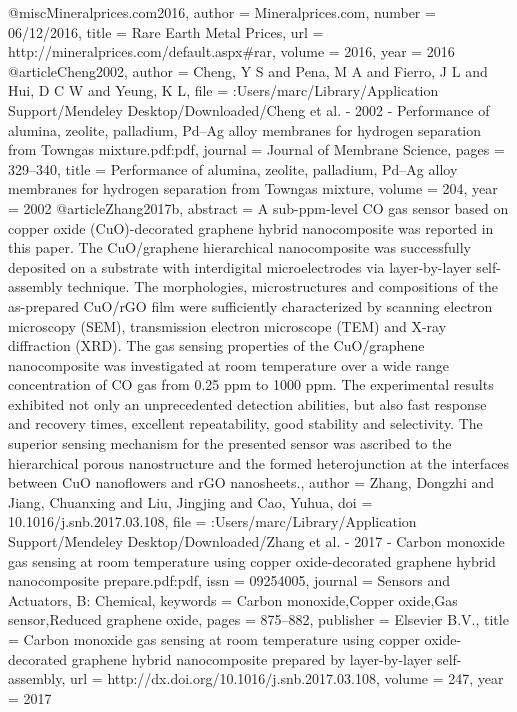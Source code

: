 @misc{Mineralprices.com2016,
author = {Mineralprices.com},
number = {06/12/2016},
title = {{Rare Earth Metal Prices}},
url = {http://mineralprices.com/default.aspx{\#}rar},
volume = {2016},
year = {2016}
}
@article{Cheng2002,
author = {Cheng, Y S and Pena, M A and Fierro, J L and Hui, D C W and Yeung, K L},
file = {:Users/marc/Library/Application Support/Mendeley Desktop/Downloaded/Cheng et al. - 2002 - Performance of alumina, zeolite, palladium, Pd–Ag alloy membranes for hydrogen separation from Towngas mixture.pdf:pdf},
journal = {Journal of Membrane Science},
pages = {329--340},
title = {{Performance of alumina, zeolite, palladium, Pd–Ag alloy membranes for hydrogen separation from Towngas mixture}},
volume = {204},
year = {2002}
}
@article{Zhang2017b,
abstract = {A sub-ppm-level CO gas sensor based on copper oxide (CuO)-decorated graphene hybrid nanocomposite was reported in this paper. The CuO/graphene hierarchical nanocomposite was successfully deposited on a substrate with interdigital microelectrodes via layer-by-layer self-assembly technique. The morphologies, microstructures and compositions of the as-prepared CuO/rGO film were sufficiently characterized by scanning electron microscopy (SEM), transmission electron microscope (TEM) and X-ray diffraction (XRD). The gas sensing properties of the CuO/graphene nanocomposite was investigated at room temperature over a wide range concentration of CO gas from 0.25 ppm to 1000 ppm. The experimental results exhibited not only an unprecedented detection abilities, but also fast response and recovery times, excellent repeatability, good stability and selectivity. The superior sensing mechanism for the presented sensor was ascribed to the hierarchical porous nanostructure and the formed heterojunction at the interfaces between CuO nanoflowers and rGO nanosheets.},
author = {Zhang, Dongzhi and Jiang, Chuanxing and Liu, Jingjing and Cao, Yuhua},
doi = {10.1016/j.snb.2017.03.108},
file = {:Users/marc/Library/Application Support/Mendeley Desktop/Downloaded/Zhang et al. - 2017 - Carbon monoxide gas sensing at room temperature using copper oxide-decorated graphene hybrid nanocomposite prepare.pdf:pdf},
issn = {09254005},
journal = {Sensors and Actuators, B: Chemical},
keywords = {Carbon monoxide,Copper oxide,Gas sensor,Reduced graphene oxide},
pages = {875--882},
publisher = {Elsevier B.V.},
title = {{Carbon monoxide gas sensing at room temperature using copper oxide-decorated graphene hybrid nanocomposite prepared by layer-by-layer self-assembly}},
url = {http://dx.doi.org/10.1016/j.snb.2017.03.108},
volume = {247},
year = {2017}
}
